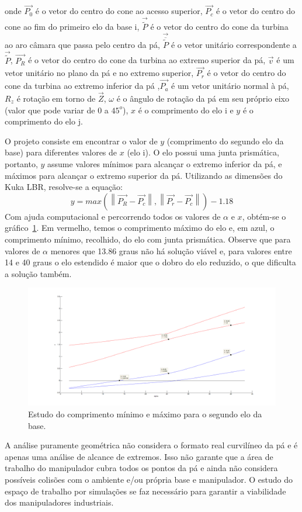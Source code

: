 onde $\overrightarrow{P_0}$ é o vetor do centro do cone ao acesso superior,
$\overrightarrow{P_c}$ é o vetor do centro do cone ao fim do primeiro elo da
base i, $\overrightarrow{\widetilde{P}}$ é o vetor do centro do cone da turbina
ao aro câmara que passa pelo centro da pá,
$\overrightarrow{\overline{\widetilde{P}}}$ é o vetor unitário correspondente a
$\overrightarrow{\widetilde{P}}$, $\overrightarrow{P_R}$ é o vetor do centro do cone da turbina
ao extremo superior da pá, $\overrightarrow{v}$ é um vetor unitário no plano da
pá e no extremo superior, $\overrightarrow{P_r}$ é o vetor do centro do cone da
turbina ao extremo inferior da pá ,$\overrightarrow{P_a}$ é um vetor unitário
normal à pá, $R_z$ é rotação em torno de $\overrightarrow{Z}$, $\omega$ é o
ângulo de rotação da pá em seu próprio eixo (valor que pode variar de $0$ a
$45^o$), $x$ é o comprimento do elo i e $y$ é o comprimento do elo j.

O projeto consiste em encontrar o valor de $y$ (comprimento do segundo elo da
base) para diferentes valores de $x$ (elo i). O elo possui uma junta
prismática, portanto, $y$ assume valores mínimos para alcançar o extremo
inferior da pá, e máximos para alcançar o extremo superior da pá.
Utilizando as dimensões do Kuka LBR, resolve-se a equação: 
$$y = max (\left \|
\overrightarrow{P_R}-\overrightarrow{P_c} \right \|, \left \|
\overrightarrow{P_r}-\overrightarrow{P_c} \right \|) - 1.18$$ 
Com ajuda computacional e percorrendo todos os valores de  $\alpha$ e $x$,
obtém-se o gráfico~\ref{yminsmallhatch}. Em vermelho, temos o comprimento máximo do elo e,
em azul, o comprimento mínimo, recolhido, do elo com junta prismática. Observe
que para valores de $\alpha$ menores que 13.86 graus não há solução viável e,
para valores entre 14 e 40 graus o elo estendido é maior que o dobro do elo
reduzido, o que dificulta a solução também.

\begin{figure}[h!]
\centering
	\includegraphics[width=\columnwidth]{figs/estudo/geometrico/yminsmallhatch.png} 
	\caption{Estudo do comprimento mínimo e máximo para o segundo elo da base.}
	\label{yminsmallhatch}
\end{figure}

A análise puramente geométrica não considera o formato real curvilíneo da pá e
é apenas uma análise de alcance de extremos. Isso não garante que a área de
trabalho do manipulador cubra todos os pontos da pá e ainda não considera
possíveis colisões com o ambiente e/ou própria base e manipulador. O estudo do
espaço de trabalho por simulações se faz necessário para garantir a viabilidade
dos manipuladores industriais.